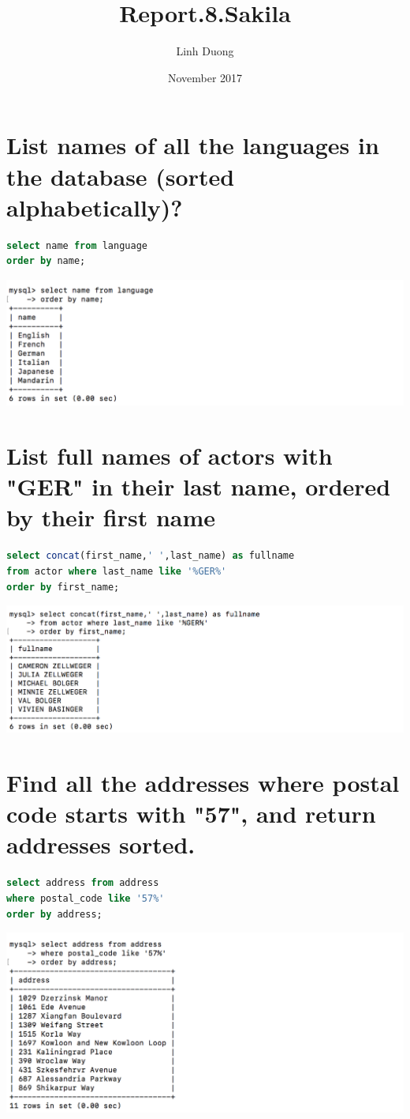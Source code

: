\documentclass{article}
\title{Report.8.Sakila}
\author{Linh Duong}
\date{November 2017}
\begin{document}
\maketitle

\section{List names of all the languages in the database (sorted alphabetically)?}
\begin{lstlisting}[language=sql]
select name from language
order by name;
\end{lstlisting}
\includegraphics[width=\linewidth]{1.png}

\section{List full names of actors with "GER" in their last name, ordered by their first name}
\begin{lstlisting}[language=sql]
select concat(first_name,' ',last_name) as fullname 
from actor where last_name like '%GER%'
order by first_name;
\end{lstlisting}
\includegraphics[width=\linewidth]{2.png}

\section{Find all the addresses where postal code starts with "57", and return addresses sorted.}
\begin{lstlisting}[language=sql]
select address from address
where postal_code like '57%'
order by address;
\end{lstlisting}
\includegraphics[width=\linewidth]{3.png}
\end{document}
